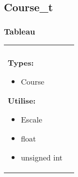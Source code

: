 \documentclass[a4paper, 11pt, oneside]{article}
\begin{document}
		\footnotetext{\textcolor{red}{Nom des opérations interne}} 
		\footnotetext{\textcolor{green}{Arguments}} 
		\footnotetext{\textcolor{blue}{Types de retour}} 
		\footnotetext{\textcolor{magenta}{Nom des opérations d'observation}}
		
		
	\subsection{Course\_t} 
		\subsubsection{Tableau}
			\begin{tabular}{|p{17cm}|c}
				\hline
				\\
				
				\textbf{Types:}
					\begin{itemize}
						\item[] Course
					\end{itemize}
				
				\textbf{Utilise:}
					\begin{itemize}
						\item[] Escale
						\item[] float
						\item[] unsigned int
					\end{itemize}
				

\end{tabular}
\end{document}
